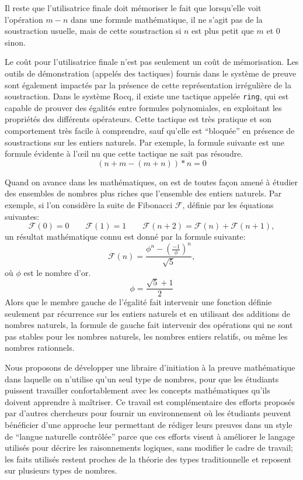 \documentclass[draft]{jflart}
\begin{document}
Il reste que l'utilisatrice finale doit mémoriser le fait que
lorsqu'elle voit l'opération \(m - n\) dans une formule mathématique,
il ne s'agit pas de la soustraction usuelle, mais de cette
soustraction si \(n\) est plus petit que \(m\) et 0 sinon.

Le coût pour l'utilisatrice finale n'est pas seulement un coût de
mémorisation.  Les outils de démonstration (appelés des tactiques)
fournis dans le système de preuve sont également impactés par la
présence de cette représentation irrégulière de la soustraction.
Dans le système Rocq, il existe une tactique appelée \texttt{ring}, qui
est capable de prouver des égalités entre formules polynomiales, en
exploitant les propriétés des différents opérateurs.  Cette tactique
est très pratique et son comportement très facile à comprendre, sauf
qu'elle est ``bloquée'' en présence de soustractions sur les entiers
naturels.  Par exemple, la formule suivante est une formule évidente à
l'œil nu que cette tactique ne sait pas résoudre.
\[(n + m - (m + n)) * n = 0\]

Quand on avance dans les mathématiques, on est de toutes façon amené à
étudier des ensembles de nombres plus riches que l'ensemble des
entiers naturels.  Par exemple, si l'on considère la suite de
Fibonacci \({\mathcal F}\), définie par les équations suivantes:
\[{\mathcal F}(0) = 0 \qquad {\mathcal F}(1)= 1\qquad {\mathcal F}(n +
2) = {\mathcal F}(n) + {\mathcal F}(n + 1),\]
un résultat mathématique connu est donné par la formule suivante:
\[{\mathcal F} (n) = \frac{\phi ^n - ({\frac{-1}{\phi}}) ^
  n}{\sqrt{5}},\]
où \(\phi\) est le nombre d'or.
\[\phi = \frac{\sqrt{5} + 1}{2}\]
Alors que le membre gauche de l'égalité fait intervenir une fonction définie
seulement par récurrence sur les entiers naturels et en utilisant des
additions de nombres naturels, la formule de gauche fait intervenir des
opérations qui ne sont pas stables pour les nombres naturels, les nombres
entiers relatifs, ou même les nombres rationnels.

Nous proposons de développer une libraire d'initiation à la preuve
mathématique dans laquelle on n'utilise qu'un seul type de nombres,
pour que les étudiants puissent travailler confortablement avec les
concepts mathématiques qu'ils doivent apprendre à maîtriser.  Ce
travail est complémentaire des efforts proposés par d'autres
chercheurs pour fournir un environnement où les étudiants peuvent
bénéficier d'une approche leur permettant de rédiger leurs preuves
dans un style de ``langue naturelle contrôlée'' parce que ces efforts
visent à améliorer le langage utilisés pour décrire les raisonnements
logiques, sans modifier le cadre de travail; les faits utilisés
restent proches de la théorie des types traditionnelle et reposent sur
plusieurs types de nombres.
\end{document}

